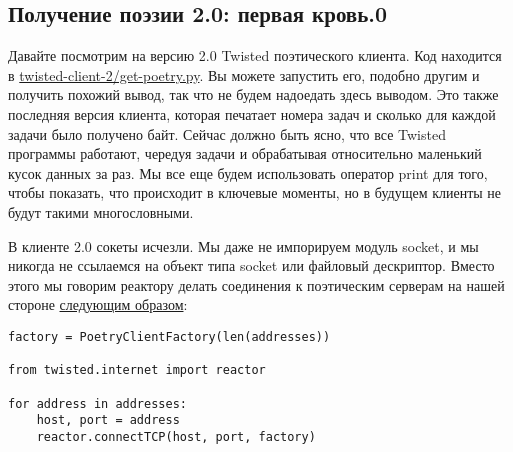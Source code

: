 \subsection{Получение поэзии 2.0: первая кровь.0}


Давайте посмотрим на версию 2.0 Twisted поэтического клиента. Код находится в 
\href{http://github.com/jdavisp3/twisted-intro/blob/master/twisted-client-2/get-poetry.py}{twisted-client-2/get-poetry.py}. 
Вы можете запустить его, подобно другим и получить похожий вывод, 
так что не будем надоедать здесь выводом. Это также последняя 
версия клиента, которая печатает номера задач и сколько для 
каждой задачи было получено байт. Сейчас должно быть ясно, что 
все Twisted программы работают, чередуя задачи и обрабатывая 
относительно маленький кусок данных за раз. Мы все еще будем 
использовать оператор print для того, чтобы показать, что происходит 
в ключевые моменты, но в будущем клиенты не будут такими многословными. 



В клиенте 2.0 сокеты исчезли. Мы даже не импорируем модуль socket, и 
мы никогда не ссылаемся на объект типа socket или файловый дескриптор. Вместо 
этого мы говорим реактору делать соединения к поэтическим 
серверам на нашей стороне  
\href{http://github.com/jdavisp3/twisted-intro/blob/master/twisted-client-2/get-poetry.py#L110}{следующим образом}:

 \begin{verbatim}
factory = PoetryClientFactory(len(addresses))

from twisted.internet import reactor

for address in addresses:
    host, port = address
    reactor.connectTCP(host, port, factory)
\end{verbatim} 

